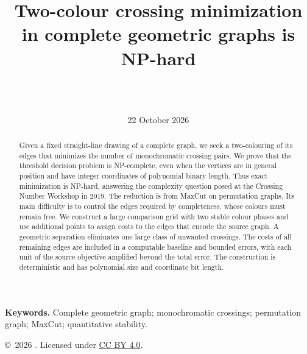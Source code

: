 \documentclass[11pt]{article}
\title{Two-colour crossing minimization\protect\\ in complete geometric graphs is NP-hard}
\author{\paperauthor
\ifx\paperaffiliation\empty\else\\{\normalsize\paperaffiliation}\fi
\ifx\paperemail\empty\else\\{\normalsize\href{mailto:\paperemail}{\texttt{\paperemail}}}\fi}
\date{22 October 2026}
\theoremstyle{definition}
\theoremstyle{remark}
\numberwithin{equation}{section}
\newcommand{\1}{\mathbf 1}
\begin{document}
\maketitle
\begin{abstract}
Given a fixed straight-line drawing of a complete graph, we seek a
two-colouring of its edges that minimizes the number of monochromatic
crossing pairs. We prove that the threshold decision problem is
NP-complete, even when the vertices are in general position and have
integer coordinates of polynomial binary length. Thus exact minimization
is NP-hard, answering the complexity question posed at the Crossing
Number Workshop in 2019. The reduction is from MaxCut on permutation
graphs. Its main difficulty is to control the edges required by
completeness, whose colours must remain free. We construct a large
comparison grid with two stable colour phases and use additional points
to assign costs to the edges that encode the source graph. A geometric
separation eliminates one large class of unwanted crossings. The costs
of all remaining edges are included in a computable baseline and bounded
errors, with each unit of the source objective amplified beyond the total
error. The construction is deterministic and has polynomial size and
coordinate bit length.
\end{abstract}
\noindent\textbf{Keywords.} Complete geometric graph; monochromatic crossings; permutation graph; MaxCut; quantitative stability.
\par\smallskip
\noindent\small\copyright\ 2026 \paperauthor. Licensed under \href{https://creativecommons.org/licenses/by/4.0/}{CC BY 4.0}.\normalsize
\clearpage
\tableofcontents
\clearpage






\appendix



\end{document}
